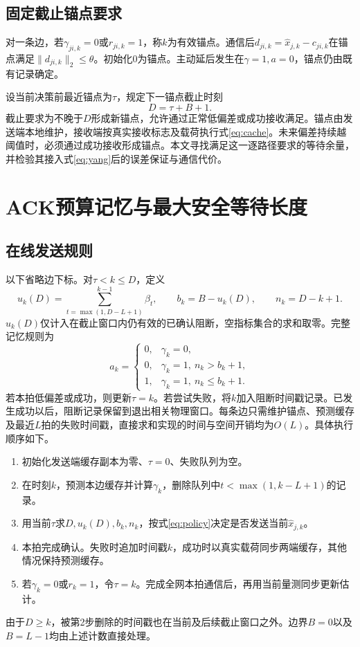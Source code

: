 \documentclass[UTF8,a4paper,zihao=5,fontset=windows]{ctexart}
\begin{document}
\subsection{固定截止锚点要求}
对一条边，若$\gamma_{ji,k}=0$或$r_{ji,k}=1$，称$k$为有效锚点。通信后$d_{ji,k}=\hat x_{j,k}-c_{ji,k}$在锚点满足$\|d_{ji,k}\|_2\le\theta$。初始化$0$为锚点。主动延后发生在$\gamma=1,a=0$，锚点仍由既有记录确定。

设当前决策前最近锚点为$\tau$，规定下一锚点截止时刻
\begin{equation}
D=\tau+B+1.
\label{eq:deadline}
\end{equation}
截止要求为不晚于$D$形成新锚点，允许通过正常低偏差或成功接收满足。锚点由发送端本地维护，接收端按真实接收标志及载荷执行式\eqref{eq:cache}。未来偏差持续越阈值时，必须通过成功接收形成锚点。本文寻找满足这一逐路径要求的等待余量，并检验其接入式\eqref{eq:yang}后的误差保证与通信代价。

\section{ACK预算记忆与最大安全等待长度}
\subsection{在线发送规则}\label{sec:online}
以下省略边下标。对$\tau<k\le D$，定义
\begin{equation}
u_k(D)=\sum_{t=\max(1,D-L+1)}^{k-1}\beta_t,\qquad
b_k=B-u_k(D),\qquad n_k=D-k+1.
\label{eq:occupancy}
\end{equation}
$u_k(D)$仅计入在截止窗口内仍有效的已确认阻断，空指标集合的求和取零。完整记忆规则为
\begin{equation}
a_k=
\begin{cases}
0,&\gamma_k=0,\\
0,&\gamma_k=1,\ n_k>b_k+1,\\
1,&\gamma_k=1,\ n_k\le b_k+1.
\end{cases}
\label{eq:policy}
\end{equation}
若本拍低偏差或成功，则更新$\tau=k$。若尝试失败，将$k$加入阻断时间戳记录。已发生成功以后，阻断记录保留到退出相关物理窗口。每条边只需维护锚点、预测缓存及最近$L$拍的失败时间戳，直接求和实现的时间与空间开销均为$O(L)$。具体执行顺序如下。
\begin{enumerate}
\setlength{\itemsep}{0pt}
\item 初始化发送端缓存副本为零、$\tau=0$、失败队列为空。
\item 在时刻$k$，预测本边缓存并计算$\gamma_k$，删除队列中$t<\max(1,k-L+1)$的记录。
\item 用当前$\tau$求$D,u_k(D),b_k,n_k$，按式\eqref{eq:policy}决定是否发送当前$\hat x_{j,k}$。
\item 本拍完成确认。失败时追加时间戳$k$，成功时以真实载荷同步两端缓存，其他情况保持预测缓存。
\item 若$\gamma_k=0$或$r_k=1$，令$\tau=k$。完成全网本拍通信后，再用当前量测同步更新估计。
\end{enumerate}
由于$D\ge k$，被第2步删除的时间戳也在当前及后续截止窗口之外。边界$B=0$以及$B=L-1$均由上述计数直接处理。
\end{document}
